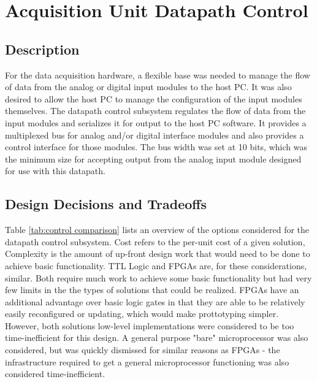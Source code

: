 \section[Datapath Control]{Acquisition Unit Datapath Control}
\subsection{Description}
For the data acquisition hardware, a flexible base was needed to manage the 
flow of data from the analog or digital input modules to the host PC. It was 
also desired to allow the host PC to manage the configuration of the input 
modules themselves. The datapath control subsystem regulates the flow of data 
from the input modules and serializes it for output to 
the host PC software. It provides a multiplexed bus for analog and/or 
digital interface modules and also provides a control interface for those 
modules. The bus width was set at 10 bits, which was the minimum size for
 accepting output from the analog input module designed for use with this 
datapath.
\subsection[Tradeoffs]{Design Decisions and Tradeoffs} 
Table \ref{tab:control comparison} lists an overview of the options considered
 for the datapath control subsystem. Cost refers to the per-unit cost of a 
given solution, Complexity is the amount of up-front design work that would
 need to be done to achieve basic functionality. TTL Logic and FPGAs are, for
 these considerations, similar. Both require much work to achieve some basic
 functionality but had very few limits in the the types of solutions that
 could be realized. FPGAs have an additional advantage over basic logic gates
 in that they are able to be relatively easily reconfigured or updating, which
 would make prottotyping simpler. However, both solutions low-level
 implementations were considered to be too time-inefficient for this design.
 A general purpose "bare" microprocessor was also considered, but was quickly
 dismissed for similar reasons as FPGAs - the infrastructure required to get
 a general microprocessor functioning was also considered time-inefficient.

